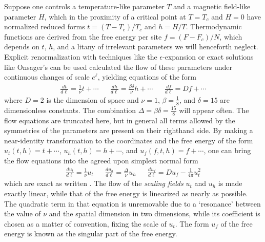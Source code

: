 \documentclass[
aps,
pre,
preprint,
longbibliography,
floatfix
]{revtex4-2}
\begin{document}
Suppose one controls a temperature-like parameter $T$ and a magnetic field-like
parameter $H$, which in the proximity of a critical point at $T=T_c$ and $H=0$
have normalized reduced forms $t=(T-T_c)/T_c$ and $h=H/T$. Thermodynamic
functions are derived from the free energy per site $f=(F-F_c)/N$, which
depends on $t$, $h$, and a litany of irrelevant parameters we will henceforth
neglect.  Explicit renormalization with techniques like the
$\epsilon$-expansion or exact solutions like Onsager's can be used calculated
the flow of these parameters under continuous changes of scale $e^\ell$,
yielding equations of the form
\begin{align} \label{eq:raw.flow}
  \frac{dt}{d\ell}=\frac1\nu t+\cdots
  &&
  \frac{dh}{d\ell}=\frac{\beta\delta}\nu h+\cdots
  &&
  \frac{df}{d\ell}=Df+\cdots
\end{align}
where $D=2$ is the dimension of space and $\nu=1$, $\beta=\frac18$, and
$\delta=15$ are dimensionless constants. The combination
$\Delta=\beta\delta=\frac{15}8$ will appear often. The flow equations are
truncated here, but in general all terms allowed by the symmetries of the
parameters are present on their righthand side. By making a near-identity
transformation to the coordinates and the free energy of the form $u_t(t,
h)=t+\cdots$, $u_h(t, h)=h+\cdots$, and $u_f(f,t,h)=f+\cdots$, one can bring
the flow equations into the agreed upon simplest normal form
\begin{align} \label{eq:flow}
  \frac{du_t}{d\ell}=\frac1\nu u_t
  &&
  \frac{du_h}{d\ell}=\frac{\Delta}\nu u_h
  &&
  \frac{du_f}{d\ell}=Du_f-\frac1{4\pi}u_t^2
\end{align}
which are exact as written \cite{Raju_2019_Normal}. The flow of the
\emph{scaling fields} $u_t$ and $u_h$ is made exactly linear, while that of the
free energy is linearized as nearly as possible. The quadratic term in that
equation is unremovable due to a `resonance' between the value of $\nu$ and the
spatial dimension in two dimensions, while its coefficient is chosen as a
matter of convention, fixing the scale of $u_t$. The form $u_f$ of the free
energy is known as the singular part of the free energy.
\end{document}
